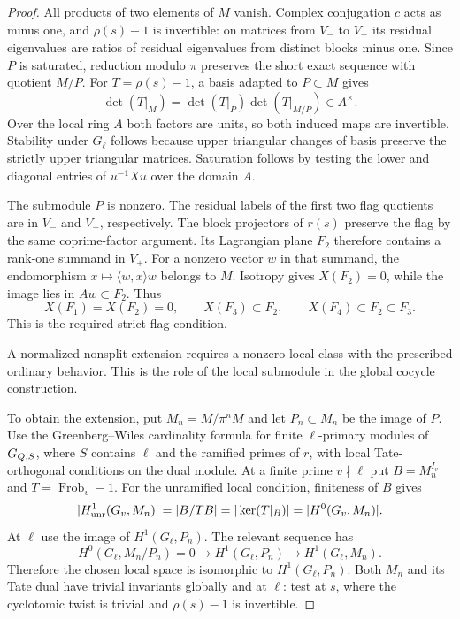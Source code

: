 \begin{proof}
All products of two elements of \(M\) vanish.
Complex conjugation \(c\) acts as minus one, and \(\rho(s)-1\) is
invertible: on matrices from \(V_-\) to \(V_+\) its residual
eigenvalues are ratios of residual eigenvalues from distinct
blocks minus one. Since \(P\) is saturated, reduction modulo \(\pi\) preserves
the short exact sequence with quotient \(M/P\). For \(T=\rho(s)-1\), a basis adapted to \(P\subset M\) gives
\[
 \det(T|_M)=\det(T|_P)\det(T|_{M/P})\in A^\times .
\]
Over the local ring \(A\) both factors are units, so both induced maps are invertible. Stability under \(G_\ell\) follows because upper
triangular changes of basis preserve the strictly upper triangular
matrices. Saturation follows by testing the lower and diagonal
entries of \(u^{-1}Xu\) over the domain \(A\).


The submodule \(P\) is nonzero. The residual labels of the first
two flag quotients are in \(V_-\) and \(V_+\), respectively. The
block projectors of \(r(s)\) preserve the flag by the same
coprime-factor argument. Its Lagrangian plane \(F_2\) therefore
contains a rank-one summand in \(V_+\). For a nonzero vector
\(w\) in that summand, the endomorphism
\(x\mapsto\langle w,x\rangle w\) belongs to \(M\). Isotropy gives \(X(F_2)=0\), while the image lies in \(Aw\subset F_2\). Thus
\[
 X(F_1)=X(F_2)=0,\qquad X(F_3)\subset F_2,\qquad X(F_4)\subset F_2\subset F_3 .
\]
This is the required strict flag condition.


A normalized nonsplit extension requires a nonzero local class with the prescribed ordinary behavior. This is the role of the local submodule in the global cocycle construction.


To obtain the extension, put \(M_n=M/\pi^n M\) and let
\(P_n\subset M_n\) be the image of \(P\). Use the Greenberg--Wiles
cardinality formula for finite \(\ell\)-primary modules of
\(G_{Q,S}\), where \(S\) contains \(\ell\) and the ramified primes
of \(r\), with local Tate-orthogonal conditions on the dual
module. At a finite prime \(v\nmid\ell\) put \(B=M_n^{I_v}\) and \(T=\operatorname{Frob}_v-1\). For the unramified local condition, finiteness of \(B\) gives
\[
 |H^1_{\rm unr}(G_v,M_n)|=|B/TB|=|\ker(T|_B)|=|H^0(G_v,M_n)|.
\] At \(\ell\) use the image of \(H^1(G_\ell,P_n)\).
The relevant sequence has
\[
     H^0(G_\ell,M_n/P_n)=0\longrightarrow H^1(G_\ell,P_n)
                        \longrightarrow H^1(G_\ell,M_n).
\]
Therefore the chosen local space is isomorphic to
\(H^1(G_\ell,P_n)\). Both \(M_n\) and its Tate dual have
trivial invariants globally and at \(\ell\): test at \(s\), where
the cyclotomic twist is trivial and \(\rho(s)-1\) is invertible.


\end{proof}
